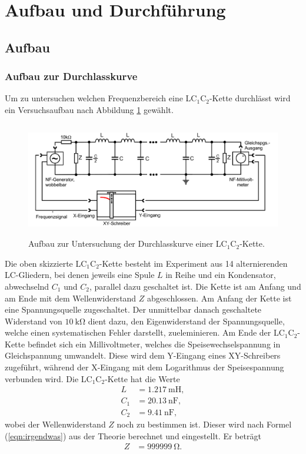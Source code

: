 \section{Aufbau und Durchführung}
\label{sec:Durchführung}
\subsection{Aufbau}
\label{sec:Aufbau}
\subsubsection{Aufbau zur Durchlasskurve}
Um zu untersuchen welchen Frequenzbereich eine LC$_1$C$_2$-Kette durchlässt wird ein Versuchsaufbau nach Abbildung \ref{dfig:1} gewählt.

\begin{figure}[H]
  \centering
  \includegraphics[height=5cm]{durchlass.png}
  \caption{Aufbau zur Untersuchung der Durchlasskurve einer LC$_1$C$_2$-Kette.}
  \label{dfig:1}
\end{figure}

Die oben skizzierte LC$_1$C$_2$-Kette besteht im Experiment aus 14 alternierenden LC-Gliedern, bei denen jeweils eine Spule $L$ in Reihe und ein Kondensator, abwechselnd $C_1$ und $C_2$, parallel dazu geschaltet ist.
Die Kette ist am Anfang und am Ende mit dem Wellenwiderstand $Z$ abgeschlossen.
Am Anfang der Kette ist eine Spannungsquelle zugeschaltet.
Der unmittelbar danach geschaltete Widerstand von $\SI{10}{\kilo\ohm}$ dient dazu, den Eigenwiderstand der Spannungsquelle, welche einen systematischen Fehler darstellt, zueleminieren.
Am Ende der LC$_1$C$_2$-Kette befindet sich ein Millivoltmeter, welches die Speisewechselspannung in Gleichspannung umwandelt.
Diese wird dem Y-Eingang eines XY-Schreibers zugeführt, während der X-Eingang mit dem Logarithmus der Speisespannung verbunden wird.
Die LC$_1$C$_2$-Kette hat die Werte
\begin{align*}
  L   &= \SI{1,217}{\milli\henry},\\
  C_1 &= \SI{20,13}{\nano\farad},\\
  C_2 &= \SI{9,41}{\nano\farad},
\end{align*}
wobei der Wellenwiderstand $Z$ noch zu bestimmen ist.
Dieser wird nach Formel (\ref{eqn:irgendwas}) aus der Theorie berechnet und eingestellt.
Er beträgt
\begin{align*}
  Z   &= \SI{999999}{\ohm}.
\end{align*}


